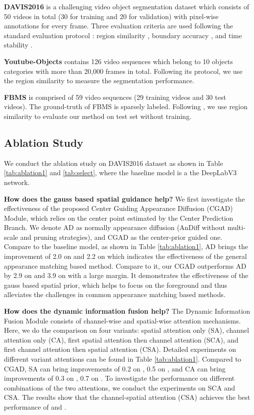 \documentclass[letterpaper]{article} \usepackage{aaai20}  \usepackage{times}  \usepackage{helvet} \usepackage{courier}  \usepackage[hyphens]{url}  \usepackage{graphicx} \urlstyle{rm} \def\UrlFont{\rm}  \usepackage{graphicx}  \frenchspacing  \setlength{\pdfpagewidth}{8.5in}  \setlength{\pdfpageheight}{11in}  \usepackage{amssymb}
\begin{document}
\noindent \textbf{DAVIS2016} is a challenging video object segmentation dataset which consists of 50 videos in total (30 for training and 20 for validation) with pixel-wise annotations for every frame. Three evaluation criteria are used following the standard evaluation protocol \cite{perazzi2016benchmark}: region similarity , boundary accuracy , and time stability .

\noindent \textbf{Youtube-Objects} contains 126 video sequences which belong to 10 objects categories with more than 20,000 frames in total. Following its protocol, we use the region similarity  to measure the segmentation performance.

\noindent \textbf{FBMS} is comprised of 59 video sequences (29 training videos and 30 test videos). The ground-truth of FBMS is sparsely labeled. Following \cite{yang2019anchor,lu2019see,zhou2020motion}, we use region similarity  to evaluate our method on test set without training.



\subsection{Ablation Study}
We conduct the ablation study on DAVIS2016 dataset as shown in Table \ref{tab:ablation1} and \ref{tab:select}, where the baseline model is a the DeepLabV3 network.

\noindent \textbf{How does the gauss based spatial guidance help?}
We first investigate the effectiveness of the proposed Center Guiding Appearance Diffusion (CGAD) Module, which relies on the center point estimated by the Center Prediction Branch. We denote AD as normally appearance diffusion (AnDiff without multi-scale and pruning strategies), and CGAD as the center-prior guided one. Compare to the baseline model, as shown in Table \ref{tab:ablation1}, AD brings the improvement of 2.0 on  and 2.2 on  which indicates the effectiveness of the general appearance matching based method. Compare to it, our CGAD outperforms AD by 2.9 on  and 3.9 on  with a large margin. It demonstrates the effectiveness of the gauss based spatial prior, which helps to focus on the foreground and thus alleviates the challenges in common appearance matching based methods.

\noindent \textbf{How does the dynamic information fusion help?} 
The Dynamic Information Fusion Module consists of channel-wise and spatial-wise attention mechanisms. Here, we do the comparison on four variants: spatial attention only (SA), channel attention only (CA), first spatial attention then channel attention (SCA), and first channel attention then spatial attention (CSA). Detailed experiments on different variant attentions can be found in Table \ref{tab:ablation1}.
Compared to CGAD, SA can bring improvements of 0.2 on , 0.5 on , and CA can bring improvements of 0.3 on , 0.7 on . 
To investigate the performance on different combinations of the two attentions, we conduct the experiments on SCA and CSA. The results show that the channel-spatial attention (CSA) achieves the best performance of  and .
\end{document}
